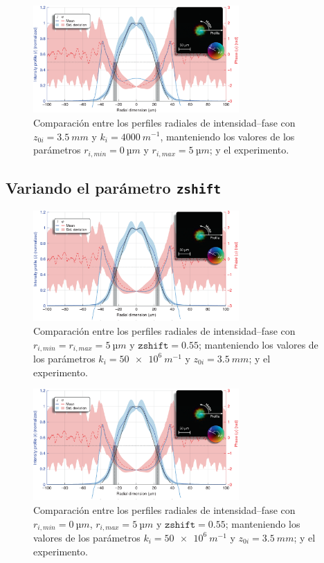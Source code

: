 \begin{figure}[htbp]
  \centering
  \includegraphics[width=0.7\textwidth]{Figuras/anx_cmp_34.png}
  \caption*{Comparación entre los perfiles radiales de intensidad--fase con $z_{0i}=\qty{3.5}{mm}$ y $k_{i}=\qty{4000}{m^{-1}}$, manteniendo los valores de los parámetros $r_{i,min}=\qty{0}{µm}$ y $r_{i,max}=\qty{5}{µm}$; y el experimento.}
\end{figure}

\subsection*{Variando el parámetro \texttt{zshift}}

\begin{figure}[htbp]
  \centering
  \includegraphics[width=0.7\textwidth]{Figuras/anx_cmp_41.png}
  \caption*{Comparación entre los perfiles radiales de intensidad--fase con $r_{i,min}=r_{i,max}=\qty{5}{µm}$ y $\texttt{zshift}=0.55$; manteniendo los valores de los parámetros $k_{i}=\qty{50e6}{m^{-1}}$ y $z_{0i}=\qty{3.5}{mm}$; y el experimento.}
\end{figure}

\begin{figure}[htbp!]
  \centering
  \includegraphics[width=0.7\textwidth]{Figuras/anx_cmp_42.png}
  \caption*{Comparación entre los perfiles radiales de intensidad--fase con $r_{i,min}=\qty{0}{µm}$, $r_{i,max}=\qty{5}{µm}$ y $\texttt{zshift}=0.55$; manteniendo los valores de los parámetros $k_{i}=\qty{50e6}{m^{-1}}$ y $z_{0i}=\qty{3.5}{mm}$; y el experimento.}
\end{figure}

